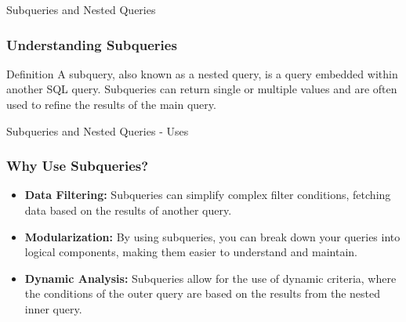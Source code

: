 \documentclass[aspectratio=169]{beamer}
\begin{document}

\begin{frame}[fragile]{Subqueries and Nested Queries}
    \frametitle{Understanding Subqueries}
    \begin{block}{Definition}
        A subquery, also known as a nested query, is a query embedded within another SQL query. 
        Subqueries can return single or multiple values and are often used to refine the results of the main query.
    \end{block}
\end{frame}

\begin{frame}[fragile]{Subqueries and Nested Queries - Uses}
    \frametitle{Why Use Subqueries?}
    \begin{itemize}
        \item \textbf{Data Filtering:} Subqueries can simplify complex filter conditions, fetching data based on the results of another query.
        \item \textbf{Modularization:} By using subqueries, you can break down your queries into logical components, making them easier to understand and maintain.
        \item \textbf{Dynamic Analysis:} Subqueries allow for the use of dynamic criteria, where the conditions of the outer query are based on the results from the nested inner query.
    \end{itemize}
\end{frame}
\end{document}
